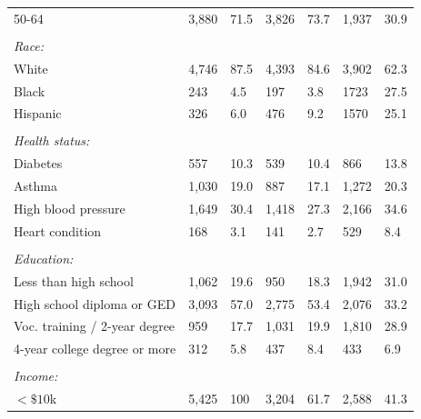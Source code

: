 \documentclass[hidelinks,12pt]{article}
\begin{document}
{\begin{singlespace}
\begin{longtable}{lllllll}
\hspace{3mm}50-64 & 3,880 & 71.5 & 3,826 & 73.7 & 1,937 & 30.9 \\ 
 &  & & &  &  & \\ 
\textit{Race:} &  & & &  &  & \\ 
\hspace{3mm}White & 4,746 & 87.5 & 4,393 & 84.6 & 3,902 & 62.3  \\ 

\hspace{3mm}Black & 243 & 4.5 & 197 & 3.8 & 1723 & 27.5  \\ 

\hspace{3mm}Hispanic & 326 & 6.0 & 476 & 9.2 & 1570 & 25.1  \\ 
 &  & & &  &  & \\ 
\textit{Health status:} &  & & &  &  & \\ 
\hspace{3mm}Diabetes & 557 & 10.3 & 539 & 10.4 & 866 & 13.8 \\ 

\hspace{3mm}Asthma & 1,030 & 19.0 & 887 & 17.1 & 1,272 & 20.3  \\ 

\hspace{3mm}High blood pressure & 1,649 & 30.4 & 1,418 & 27.3 & 2,166 & 34.6  \\ 
  
\hspace{3mm}Heart condition & 168 & 3.1 & 141 & 2.7 & 529 & 8.4 \\ 
 &  & & &  &  & \\ 
\textit{Education:} &  & & &  &  & \\  
\hspace{3mm}Less than high school  & 1,062 & 19.6 & 950 & 18.3 & 1,942 & 31.0  \\ 
  
\hspace{3mm}High school diploma or GED & 3,093 & 57.0 & 2,775 & 53.4 & 2,076 & 33.2  \\ 

\hspace{3mm}Voc. training / 2-year degree & 959 & 17.7 & 1,031 & 19.9 & 1,810 & 28.9 \\ 

\hspace{3mm}4-year college degree or more & 312 & 5.8 & 437 & 8.4 & 433 & 6.9 \\ 
 &  & & &  &  & \\ 
\textit{Income:} &  & & &  &  & \\ 
\hspace{3mm} $<\$10$k & 5,425 & 100 & 3,204 & 61.7 & 2,588 & 41.3 \\


\end{longtable}
\end{singlespace}}
\end{document}
